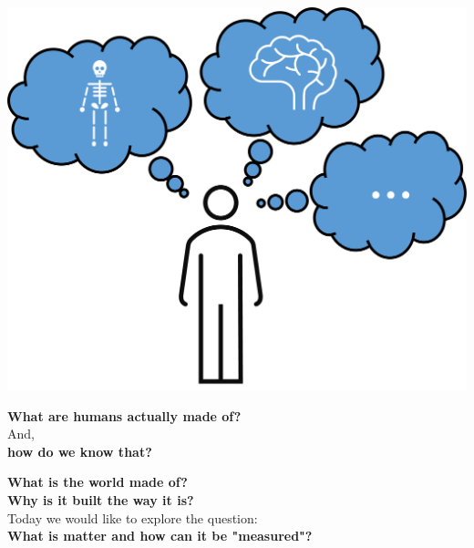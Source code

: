 \section{}
\begin{frame}
\begin{minipage}[t]{0.4\textwidth}
    \includegraphics[width=\textwidth]{Figures Introductory Lecture/Introduction/Human.png}
\end{minipage}
\begin{minipage}[t]{0.43\textwidth}
   \vspace{-3cm} \centering
     \Large{ \textbf{What are humans actually made of?}} \\ \vspace{0.5cm} \normalsize{And,} \\ \Large \textbf{how do we know that?} %
\end{minipage}  
\end{frame}
\begin{frame}
    \begin{center}
    \Large \textbf{What is the world made of?} \\
    \vspace{1cm}
   \textbf{Why is it built the way it is?}\\
     \vspace{1cm}
        \large Today we would like to explore the question: \\ 
    \Large  \textbf{What is matter and how can it be "measured"?}
    \end{center}
    \end{frame}

